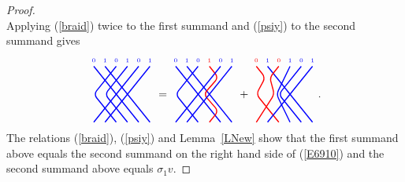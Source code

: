 \documentclass[twoside,11pt,reqno]{amsart}
\numberwithin{equation}{section}
\theoremstyle{definition}  %
\newcommand{\0}{{\bar 0}}
\newcommand{\1}{{\bar 1}}
\newcommand{\si}{\sigma}
\newenvironment{braid}{%
  \begin{tikzpicture}[baseline=6mm,blue,line width=1pt, scale=0.4,
                      draw/.append style={rounded corners},
                      every node/.append style={font=\fontsize{5}{5}\selectfont}]%
  }{\end{tikzpicture}
}
\begin{document}
\begin{proof}
$$$$
Applying (\ref{braid}) twice to the first summand and (\ref{psiy}) to the second summand gives
$$
   \begin{braid}\tikzset{scale=0.9,baseline=8mm}
      \draw(0,5)node[above]{$0$}--(4,0);
      \draw(1,5)node[above]{$1$}--(5,0);
      \draw(2,5)node[above]{$0$}--(0,2.5)--(2,0);
      \draw(3,5)node[above]{$1$}--(1,2.5)--(3,0);
      \draw(4,5)node[above]{$0$}--(0,0);
      \draw(5,5)node[above]{$1$}--(1,0);
    \end{braid}
    =
   \begin{braid}\tikzset{scale=0.9,baseline=8mm}
      \draw(0,5)node[above]{$0$}--(4,0);
      \draw(1,5)node[above]{$1$}--(5,0);
      \draw(2,5)node[above]{$0$}--(0,2.5)--(2,0);
      \draw[red](3,5)node[above]{$1$}--(3.8,4)--(2.5,2.5)--(3.8,1.0)--(3,0);
      \draw(4,5)node[above]{$0$}--(0,0);
      \draw(5,5)node[above]{$1$}--(1,0);
    \end{braid}
    +\begin{braid}\tikzset{scale=0.9,baseline=8mm}
      \draw[red](0,5)node[above]{$0$}--(0.8,4)--(0,2.5)--(2,0);
      \draw(1,5)node[above]{$1$}--(5,0);
      \draw[red](2,5)node[above]{$0$}--(1.2,4)--(1.6,2.5)--(0,0);
      \draw(3,5)node[above]{$1$}--(1.8,2.5)--(3,0);
      \draw(4,5)node[above]{$0$}--(2,2.5)--(4,0);
      \draw(5,5)node[above]{$1$}--(1,0);
    \end{braid}.
$$
The relations  (\ref{braid}), (\ref{psiy}) and Lemma~\ref{LNew} show that the first summand above equals the second summand on the right hand side of (\ref{E6910}) and the second  summand above equals $\si_1v$. 


\end{proof}
\end{document}
